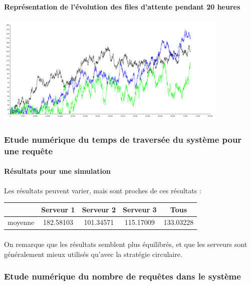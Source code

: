 \documentclass{article}
\begin{document}
\paragraph{Représentation de l'évolution des files d'attente pendant 20 heures}
\begin{center}
	\includegraphics[width=425px]{img/alea20h.png}
\end{center}

\subsubsection{Etude numérique du temps de traversée du système pour une requête}

\paragraph{Résultats pour une simulation}
Les résultats peuvent varier, mais sont proches de ces résultats :
\begin{center}
	\begin{tabular}{c|ccc|c}
		\hline \hline
		& Serveur 1 & Serveur 2 & Serveur 3 & Tous \\
		\hline
		moyenne & 182.58103 & 101.34571 & 115.17009 & 133.03228 \\
		\hline \hline
	\end{tabular}
\end{center}
\paragraph{}
On remarque que les résultats semblent plus équilibrés, et que les serveurs sont généralement mieux utilisés qu'avec la stratégie circulaire.

\subsubsection{Etude numérique du nombre de requêtes dans le système}
\end{document}
